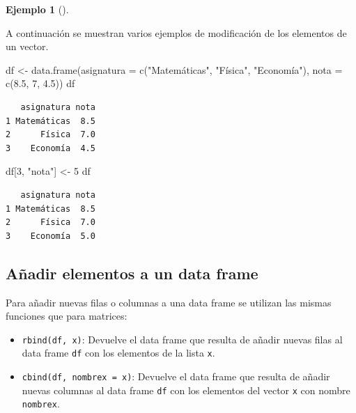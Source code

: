 \documentclass[
  a4paper,
]{scrreport}
\newenvironment{Shaded}{\begin{snugshade}}{\end{snugshade}}
\newcommand{\AttributeTok}[1]{\textcolor[rgb]{0.40,0.45,0.13}{#1}}
\newcommand{\DecValTok}[1]{\textcolor[rgb]{0.68,0.00,0.00}{#1}}
\newcommand{\FloatTok}[1]{\textcolor[rgb]{0.68,0.00,0.00}{#1}}
\newcommand{\FunctionTok}[1]{\textcolor[rgb]{0.28,0.35,0.67}{#1}}
\newcommand{\NormalTok}[1]{\textcolor[rgb]{0.00,0.23,0.31}{#1}}
\newcommand{\OtherTok}[1]{\textcolor[rgb]{0.00,0.23,0.31}{#1}}
\newcommand{\StringTok}[1]{\textcolor[rgb]{0.13,0.47,0.30}{#1}}
\theoremstyle{definition}
\theoremstyle{definition}
\newtheorem{example}{Ejemplo}[chapter]
\theoremstyle{remark}
\begin{document}
\leavevmode{}%
\begin{example}[]\label{exm-modificacion-data-frames}

A continuación se muestran varios ejemplos de modificación de los
elementos de un vector.

\begin{Shaded}
\begin{Highlighting}[]
\NormalTok{df }\OtherTok{\textless{}{-}} \FunctionTok{data.frame}\NormalTok{(}\AttributeTok{asignatura =} \FunctionTok{c}\NormalTok{(}\StringTok{"Matemáticas"}\NormalTok{, }\StringTok{"Física"}\NormalTok{, }\StringTok{"Economía"}\NormalTok{), }\AttributeTok{nota =} \FunctionTok{c}\NormalTok{(}\FloatTok{8.5}\NormalTok{, }\DecValTok{7}\NormalTok{, }\FloatTok{4.5}\NormalTok{))}
\NormalTok{df}
\end{Highlighting}
\end{Shaded}

\begin{verbatim}
   asignatura nota
1 Matemáticas  8.5
2      Física  7.0
3    Economía  4.5
\end{verbatim}

\begin{Shaded}
\begin{Highlighting}[]
\NormalTok{df[}\DecValTok{3}\NormalTok{, }\StringTok{"nota"}\NormalTok{] }\OtherTok{\textless{}{-}} \DecValTok{5}
\NormalTok{df}
\end{Highlighting}
\end{Shaded}

\begin{verbatim}
   asignatura nota
1 Matemáticas  8.5
2      Física  7.0
3    Economía  5.0
\end{verbatim}

\end{example}

\hypertarget{auxf1adir-elementos-a-un-data-frame}{%
\subsection{Añadir elementos a un data
frame}\label{auxf1adir-elementos-a-un-data-frame}}

Para añadir nuevas filas o columnas a una data frame se utilizan las
mismas funciones que para matrices:

\begin{itemize}
\item
  \texttt{rbind(df,\ x)}: Devuelve el data frame que resulta de añadir
  nuevas filas al data frame \texttt{df} con los elementos de la lista
  \texttt{x}.
\item
  \texttt{cbind(df,\ nombrex\ =\ x)}: Devuelve el data frame que resulta
  de añadir nuevas columnas al data frame \texttt{df} con los elementos
  del vector \texttt{x} con nombre \texttt{nombrex}.
\end{itemize}
\end{document}
